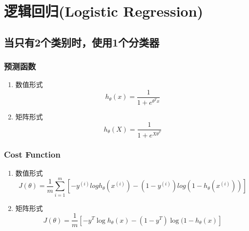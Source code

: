 \section{逻辑回归(Logistic Regression)}
\subsection{当只有2个类别时，使用1个分类器}


\subsubsection{预测函数}
\begin{enumerate}
\item 数值形式
\begin{equation}
	h_\theta(x) = \frac{1}{1 + e^{\theta^T x}}
\end{equation}

\item 矩阵形式
\begin{equation}
	h_\theta(X) = \frac{1}{1 + e^{X \theta^T}}
\end{equation}
\end{enumerate}


\subsubsection{Cost Function}
\begin{enumerate}
\item 数值形式
\begin{equation}
	J(\theta) = \frac{1}{m}
	    \sum_{i=1}^m \left[ -y^{(i)}log{h_\theta(x^{(i)})} - (1-y^{(i)})log{(1-h_\theta(x^{(i)}))} \right]
\end{equation}

\item 矩阵形式
\begin{equation}
		J(\theta) = \frac{1}{m} \left[-y^T \log{h_\theta(x)} - (1-y^T) \log{(1-h_\theta(x)}\right]
\end{equation}
\end{enumerate}



